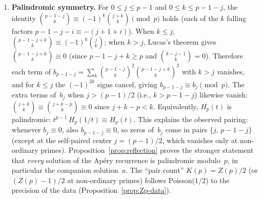 \documentclass[11pt]{article}
\theoremstyle{definition}
\theoremstyle{remark}
\begin{document}
\begin{enumerate}
\item \textbf{Palindromic symmetry.}
For $0 \le j \le p-1$ and $0 \le k \le p-1-j$,
the identity
$\binom{p{-}1{-}j}{k} \equiv (-1)^k \binom{j+k}{k}
\pmod{p}$ holds (each of the $k$ falling factors
$p{-}1{-}j{-}i \equiv -(j{+}1{+}i)$).
When $k \le j$,
$\binom{p{-}1{-}j{+}k}{k} \equiv (-1)^k \binom{j}{k}$;
when $k > j$, Lucas's theorem gives
$\binom{p{-}1{-}j{+}k}{k} \equiv 0$ (since
$p{-}1{-}j{+}k \ge p$ and
$\binom{k{-}j{-}1}{k} = 0$).
Therefore each term of
$b_{p-1-j} = \sum_{k} \binom{p{-}1{-}j}{k}^2
\binom{p{-}1{-}j{+}k}{k}^2$ with $k > j$ vanishes,
and for $k \le j$ the $(-1)^{2k}$ signs cancel,
giving $b_{p-1-j} \equiv b_j \pmod{p}$.
The extra terms of~$b_j$ when $j > (p{-}1)/2$
(i.e., $k > p{-}1{-}j$) likewise vanish:
$\binom{j{+}k}{k} \equiv \binom{j{+}k{-}p}{k}
\equiv 0$ since $j{+}k{-}p < k$.
Equivalently, $H_p(t)$ is palindromic:
$t^{p-1}\, H_p(1/t) \equiv H_p(t)$.
This explains the observed pairing:
whenever $b_j \equiv 0$, also
$b_{p-1-j} \equiv 0$, so zeros of~$b_j$
come in pairs $\{j,\, p-1-j\}$ (except
at the self-paired center $j = (p-1)/2$,
which vanishes only at non-ordinary primes).
Proposition~\ref{prop:reflection} proves the
stronger statement that \emph{every} solution
of the Ap\'ery recurrence is palindromic
modulo~$p$, in particular the companion solution~$a$.
The ``pair count'' $K(p) = Z(p)/2$
(or $(Z(p)-1)/2$ at non-ordinary primes)
follows Poisson($1/2$) to the
precision of the data (Proposition~\ref{prop:Zp-data}).


\end{enumerate}
\end{document}
